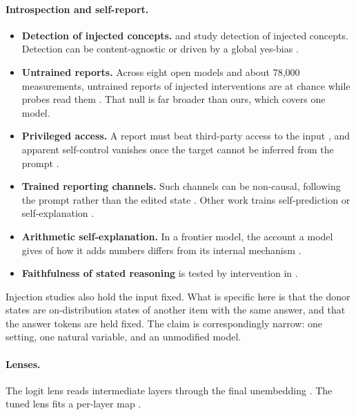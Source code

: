 \documentclass[11pt]{article}
\begin{document}
\paragraph{Introspection and self-report.}
\begin{itemize}
\item \textbf{Detection of injected concepts.} \citet{lindsey2025emergent} and \citet{macar2026mechanisms} study detection of injected concepts. Detection can be content-agnostic \citep{lederman2026contentagnostic} or driven by a global yes-bias \citep{hahami2025detecting,ramdan2026injected}.
\item \textbf{Untrained reports.} Across eight open models and about 78,000 measurements, untrained reports of injected interventions are at chance while probes read them \citep{ferrara2026owmi}. That null is far broader than ours, which covers one model.
\item \textbf{Privileged access.} A report must beat third-party access to the input \citep{song2025privileged,singh2026reality}, and apparent self-control vanishes once the target cannot be inferred from the prompt \citep{aoki2026neurofeedback}.
\item \textbf{Trained reporting channels.} Such channels can be non-causal, following the prompt rather than the edited state \citep{hatua2026verbalization}. Other work trains self-prediction or self-explanation \citep{binder2024looking,li2025training,guo2026introspective}.
\item \textbf{Arithmetic self-explanation.} In a frontier model, the account a model gives of how it adds numbers differs from its internal mechanism \citep{lindsey2025biology}.
\item \textbf{Faithfulness of stated reasoning} is tested by intervention in \citet{lanham2023measuring}.
\end{itemize}
Injection studies also hold the input fixed. What is specific here is that the donor states are on-distribution states of another item with the same answer, and that the answer tokens are held fixed. The claim is correspondingly narrow: one setting, one natural variable, and an unmodified model.

\paragraph{Lenses.} The logit lens reads intermediate layers through the final unembedding \citep{nostalgebraist2020logitlens}. The tuned lens fits a per-layer map \citep{belrose2023eliciting}.
\end{document}
